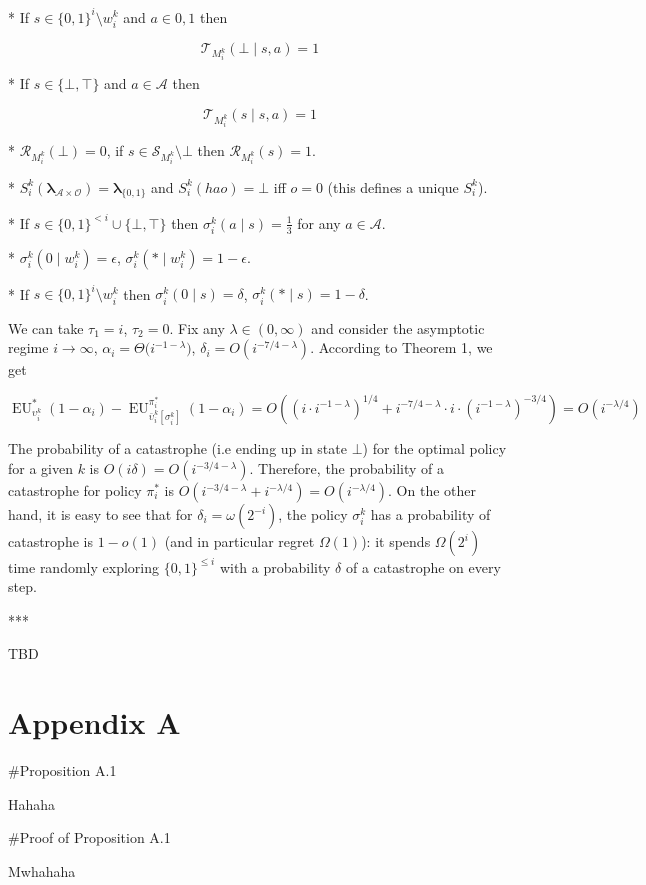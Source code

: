 \documentclass[a4paper]{article}
\newcommand{\Bool}{\{0,1\}}
\newcommand{\AP}[1]{\left(#1\right)}
\newcommand{\AB}[1]{\left[#1\right]}
\newcommand{\Estr}{\boldsymbol{\lambda}}
\newcommand{\Ob}{\mathcal{O}}
\newcommand{\A}{\mathcal{A}}
\newcommand{\St}{\mathcal{S}}
\newcommand{\T}{\mathcal{T}}
\newcommand{\R}{\mathcal{R}}
\newcommand{\MF}{M^{\text{F}}}
\newcommand{\EU}{\operatorname{EU}}
\begin{document}
* If $s \in \Bool^i \setminus w_i^k$ and $a \in {0,1}$ then

$$\T_{M_i^k}(\bot \mid s,a) = 1$$

* If $s \in \{\bot,\top\}$ and $a \in \A$ then

$$\T_{M_i^k}(s \mid s,a) = 1$$

* $\R_{M_i^k}(\bot)=0$, if $s \in \St_{M_i^k} \setminus \bot$ then $\R_{M_i^k}(s)=1$.

* $S_i^k(\Estr_{\A \times \Ob})=\Estr_{\Bool}$ and $S_i^k(hao)=\bot$ iff $o = 0$ (this defines a unique $S_i^k$).

* If $s \in \Bool^{<i} \cup \{\bot,\top\}$ then $\sigma_i^k(a \mid s) = \frac{1}{3}$ for any $a \in \A$.

* $\sigma_i^k(0 \mid w_i^k) = \epsilon$, $\sigma_i^k(* \mid w_i^k) = 1 - \epsilon$.

* If $s \in \Bool^i \setminus w_i^k$ then $\sigma_i^k(0 \mid s) = \delta$, $\sigma_i^k(* \mid s) = 1 - \delta$.

We can take $\tau_1 = i$, $\tau_2 = 0$. Fix any $\lambda \in (0,\infty)$ and consider the asymptotic regime $i \rightarrow \infty$, $\alpha_i = \Theta\Big(i^{-1-\lambda}\Big)$, $\delta_i = O\AP{i^{-7/4-\lambda}}$. According to Theorem 1, we get

$$\EU_{\upsilon_i^k}^*(1-\alpha_i) - \EU_{\bar{\upsilon}_i^k\AB{\sigma_i^k}}^{\pi_i^*}(1-\alpha_i) = O\AP{\AP{i \cdot i^{-1-\lambda}}^{1/4}+i^{-7/4-\lambda}\cdot i \cdot \AP{i^{-1-\lambda}}^{-3/4}} = O\AP{i^{-\lambda/4}}$$

The probability of a catastrophe (i.e ending up in state $\bot$) for the optimal policy for a given $k$ is $O\AP{i\delta}=O\AP{i^{-3/4-\lambda}}$. Therefore, the probability of a catastrophe for policy $\pi_i^*$ is $O\AP{i^{-3/4-\lambda}+i^{-\lambda/4}}=O\AP{i^{-\lambda/4}}$. On the other hand, it is easy to see that for $\delta_i = \omega\AP{2^{-i}}$, the policy $\sigma_i^k$ has a probability of catastrophe is $1-o(1)$ (and in particular  regret $\Omega(1)$): it spends $\Omega(2^i)$ time randomly exploring $\Bool^{\leq i}$ with a probability $\delta$ of a catastrophe on every step.

***

TBD


\section{Appendix A}

\#Proposition A.1

Hahaha

\#Proof of Proposition A.1

Mwhahaha
\end{document}
